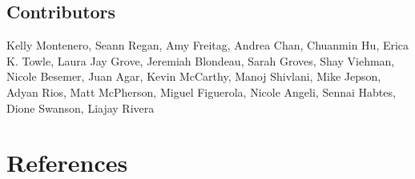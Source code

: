 \documentclass[
  letterpaper,
  oneside,
  open=any]{scrbook}
\begin{document}
\section{\texorpdfstring{\textbf{Contributors}}{Contributors}}\label{contributors-1}

Kelly Montenero, Seann Regan, Amy Freitag, Andrea Chan, Chuanmin Hu,
Erica K. Towle, Laura Jay Grove, Jeremiah Blondeau, Sarah Groves, Shay
Viehman, Nicole Besemer, Juan Agar, Kevin McCarthy, Manoj Shivlani, Mike
Jepson, Adyan Rios, Matt McPherson, Miguel Figuerola, Nicole Angeli,
Sennai Habtes, Dione Swanson, Liajay Rivera


\chapter*{References}\label{references}

\end{document}
